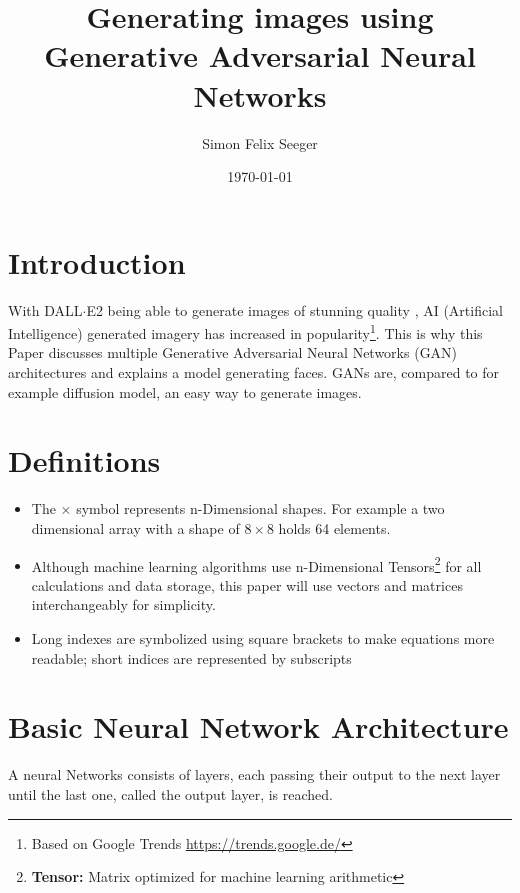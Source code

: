 \documentclass{article}
\title{Generating images using Generative Adversarial Neural Networks}
\author{Simon Felix Seeger}
\date{\today}
\begin{document}



\tableofcontents
\listoffigures
\newpage


\section{Introduction}
With DALL$\cdot$E2 being able to generate images of stunning quality \autocite{ramesh_hierarchical_2022}, AI (Artificial Intelligence) generated imagery has increased in popularity\footnote{Based on Google Trends \url{https://trends.google.de/}}.
This is why this Paper discusses multiple Generative Adversarial Neural Networks (GAN) architectures and explains a model generating faces. GANs are, compared to for example diffusion model, an easy way to generate images. 

\section{Definitions}

\begin{itemize}
    \item The $\times$ symbol represents n-Dimensional shapes. For example a two dimensional array with a shape of $8\times 8$ holds 64 elements.
    \item Although machine learning algorithms use n-Dimensional Tensors\footnote{\textbf{Tensor:} Matrix optimized for machine learning arithmetic} for all calculations and data storage, this paper will use vectors and matrices interchangeably for simplicity.
    \item Long indexes are symbolized using square brackets to make equations more readable; short indices are represented by subscripts
\end{itemize}


\section{Basic Neural Network Architecture}
A neural Networks consists of layers, each passing their output to the next layer until the last one, called the output layer, is reached. 
\end{document}
